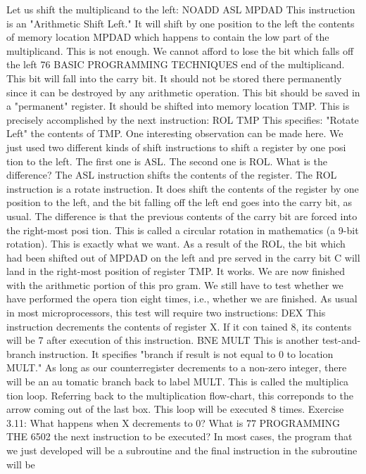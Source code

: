 Let us shift the multiplicand to the left:
NOADD ASL MPDAD
This instruction is an "Arithmetic Shift Left." It will shift by one
position to the left the contents of memory location MPDAD
which happens to contain the low part of the multiplicand. This is
not enough. We cannot afford to lose the bit which falls off the left
76
BASIC PROGRAMMING TECHNIQUES
end of the multiplicand. This bit will fall into the carry bit. It
should not be stored there permanently since it can be destroyed
by any arithmetic operation. This bit should be saved in a
"permanent" register. It should be shifted into memory location
TMP. This is precisely accomplished by the next instruction:
ROL TMP
This specifies: "Rotate Left" the contents of TMP.
One interesting observation can be made here. We just used two
different kinds of shift instructions to shift a register by one posi
tion to the left. The first one is ASL. The second one is ROL.
What is the difference?
The ASL instruction shifts the contents of the register. The
ROL instruction is a rotate instruction. It does shift the contents
of the register by one position to the left, and the bit falling off the
left end goes into the carry bit, as usual. The difference is that the
previous contents of the carry bit are forced into the right-most posi
tion. This is called a circular rotation in mathematics (a 9-bit
rotation). This is exactly what we want. As a result of the ROL,
the bit which had been shifted out of MPDAD on the left and pre
served in the carry bit C will land in the right-most position of
register TMP. It works.
We are now finished with the arithmetic portion of this pro
gram. We still have to test whether we have performed the opera
tion eight times, i.e., whether we are finished. As usual in most
microprocessors, this test will require two instructions:
DEX
This instruction decrements the contents of register X. If it con
tained 8, its contents will be 7 after execution of this instruction.
BNE MULT
This is another test-and-branch instruction. It specifies "branch if
result is not equal to 0 to location MULT." As long as our counterregister
decrements to a non-zero integer, there will be an au
tomatic branch back to label MULT. This is called the multiplica
tion loop. Referring back to the multiplication flow-chart, this correponds
to the arrow coming out of the last box. This loop will be
executed 8 times.
Exercise 3.11: What happens when X decrements to 0? What is
77
PROGRAMMING THE 6502
the next instruction to be executed?
In most cases, the program that we just developed will be a
subroutine and the final instruction in the subroutine will be
